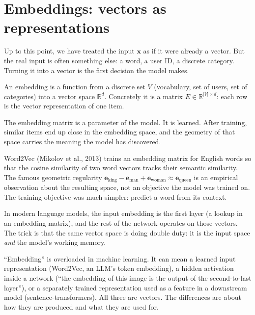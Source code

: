 \section{Embeddings: vectors as representations}

Up to this point, we have treated the input $\bm{x}$ as if it were already a vector. But the real input is often something else: a word, a user ID, a discrete category. Turning it into a vector is the first decision the model makes.

\begin{definition}[Embedding]
An embedding is a function from a discrete set $V$ (vocabulary, set of users, set of categories) into a vector space $\mathbb{R}^d$. Concretely it is a matrix $E \in \mathbb{R}^{|V| \times d}$: each row is the vector representation of one item.
\end{definition}

The embedding matrix is a parameter of the model. It is learned. After training, similar items end up close in the embedding space, and the geometry of that space carries the meaning the model has discovered.

\begin{example}
Word2Vec (Mikolov et al., 2013) trains an embedding matrix for English words so that the cosine similarity of two word vectors tracks their semantic similarity. The famous geometric regularity $\bm{e}_{\text{king}} - \bm{e}_{\text{man}} + \bm{e}_{\text{woman}} \approx \bm{e}_{\text{queen}}$ is an empirical observation about the resulting space, not an objective the model was trained on. The training objective was much simpler: predict a word from its context.
\end{example}

In modern language models, the input embedding is the first layer (a lookup in an embedding matrix), and the rest of the network operates on those vectors. The trick is that the same vector space is doing double duty: it is the input space \emph{and} the model's working memory.

\begin{warningbox}
``Embedding'' is overloaded in machine learning. It can mean a learned input representation (Word2Vec, an LLM's token embedding), a hidden activation inside a network (``the embedding of this image is the output of the second-to-last layer''), or a separately trained representation used as a feature in a downstream model (sentence-transformers). All three are vectors. The differences are about how they are produced and what they are used for.
\end{warningbox}

